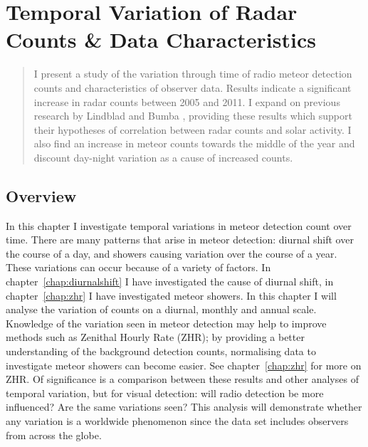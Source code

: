 \chapter{Temporal Variation of Radar Counts \& Data Characteristics}
\label{chap:temporal}
\begin{strip}
	\begin{minipage}{\textwidth}
		\begin{abstract}
			I present a study of the variation through time of radio meteor detection counts and characteristics of observer data. Results indicate a significant increase in radar counts between 2005 and 2011. I expand on previous research by Lindblad \cite{lindblad} and Bumba \cite{bumba}, providing these results which support their hypotheses of correlation between radar counts and solar activity. I also find an increase in meteor counts towards the middle of the year and discount day-night variation as a cause of increased counts.
		\end{abstract}
	\end{minipage}
\end{strip}
\section{Overview}
In this chapter I investigate temporal variations in meteor detection count over time. There are many patterns that arise in meteor detection: diurnal shift over the course of a day, and showers causing variation over the course of a year. These variations can occur because of a variety of factors. In chapter~\ref{chap:diurnalshift} I have investigated the cause of diurnal shift, in chapter~\ref{chap:zhr} I have investigated meteor showers. In this chapter I will analyse the variation of counts on a diurnal, monthly and annual scale.\\
Knowledge of the variation seen in meteor detection may help to improve methods such as Zenithal Hourly Rate (ZHR); by providing a better understanding of the background detection counts, normalising data to investigate meteor showers can become easier. See chapter~\ref{chap:zhr} for more on ZHR. Of significance is a comparison between these results and other analyses of temporal variation, but for visual detection: will radio detection be more influenced? Are the same variations seen? This analysis will demonstrate whether any variation is a worldwide phenomenon since the data set includes observers from across the globe.
